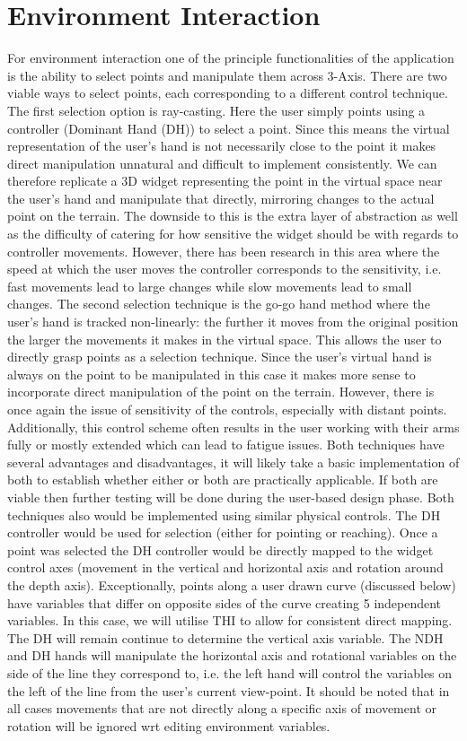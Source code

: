 \documentclass{sig-alternate-05-2015}
\begin{document}
\section{Environment Interaction}
For environment interaction one of the principle functionalities of the application is the ability to select points and manipulate them across 3-Axis. There are two viable ways to select points, each corresponding to a different control technique. 
The first selection option is ray-casting. Here the user simply points using a controller (Dominant Hand (DH)) to select a point. Since this means the virtual representation of the user's hand is not necessarily close to the point it makes direct manipulation unnatural and difficult to implement consistently. We can therefore replicate a 3D widget representing the point in the virtual space near the user's hand and manipulate that directly, mirroring changes to the actual point on the terrain. The downside to this is the extra layer of abstraction as well as the difficulty of catering for how sensitive the widget should be with regards to controller movements. However, there has been research in this area where the speed at which the user moves the controller corresponds to the sensitivity, i.e. fast movements lead to large changes while slow movements lead to small changes.
The second selection technique is the go-go hand method where the user's hand is tracked non-linearly: the further it moves from the original position the larger the movements it makes in the virtual space. This allows the user to directly grasp points as a selection technique. Since the user's virtual hand is always on the point to be manipulated in this case it makes more sense to incorporate direct manipulation of the point on the terrain. However, there is once again the issue of sensitivity of the controls, especially with distant points. Additionally, this control scheme often results in the user working with their arms fully or mostly extended which can lead to fatigue issues.
Both techniques have several advantages and disadvantages, it will likely take a basic implementation of both to establish whether either or both are practically applicable. If both are viable then further testing will be done during the user-based design phase. Both techniques also would be implemented using similar physical controls. The DH controller would be used for selection (either for pointing or reaching). Once a point was selected the DH controller would be directly mapped to the widget control axes (movement in the vertical and horizontal axis and rotation around the depth axis). Exceptionally, points along a user drawn curve (discussed below) have variables that differ on opposite sides of the curve creating 5 independent variables. In this case, we will utilise THI to allow for consistent direct mapping. The DH will remain continue to determine the vertical axis variable. The NDH and DH hands will manipulate the horizontal axis and rotational variables on the side of the line they correspond to, i.e. the left hand will control the variables on the left of the line from the user's current view-point. It should be noted that in all cases movements that are not directly along a specific axis of movement or rotation will be ignored wrt editing environment variables.
\end{document}
